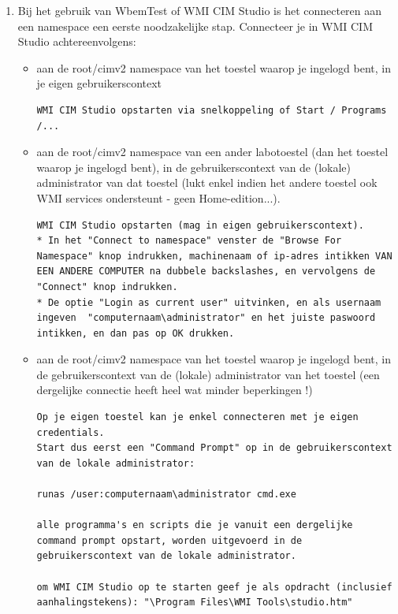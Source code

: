 \documentclass[11pt,a4paper]{report}
\begin{document}
\begin{enumerate} 
	\item Bij het gebruik van WbemTest of WMI CIM Studio is het connecteren aan een namespace een eerste noodzakelijke stap. Connecteer je in WMI CIM Studio achtereenvolgens:
	\begin{itemize}
		\item aan de root/cimv2 namespace van het toestel waarop je ingelogd bent, in je eigen gebruikerscontext
		\begin{lstlisting}
WMI CIM Studio opstarten via snelkoppeling of Start / Programs /...
		\end{lstlisting}
		\item aan de root/cimv2 namespace van een ander labotoestel (dan het toestel waarop je ingelogd bent), in de gebruikerscontext van de (lokale) administrator van dat toestel
		(lukt enkel indien het andere toestel ook WMI services ondersteunt - geen Home-edition...).
		\begin{lstlisting}
WMI CIM Studio opstarten (mag in eigen gebruikerscontext). 
* In het "Connect to namespace" venster de "Browse For Namespace" knop indrukken, machinenaam of ip-adres intikken VAN EEN ANDERE COMPUTER na dubbele backslashes, en vervolgens de "Connect" knop indrukken. 
* De optie "Login as current user" uitvinken, en als usernaam ingeven  "computernaam\administrator" en het juiste paswoord intikken, en dan pas op OK drukken.
		\end{lstlisting}
		\item aan de root/cimv2 namespace van het toestel waarop je ingelogd bent, in de gebruikerscontext van de (lokale) administrator van het toestel (een dergelijke connectie heeft heel wat minder beperkingen !)
		\begin{lstlisting}
Op je eigen toestel kan je enkel connecteren met je eigen credentials. 
Start dus eerst een "Command Prompt" op in de gebruikerscontext van de lokale administrator: 

runas /user:computernaam\administrator cmd.exe

alle programma's en scripts die je vanuit een dergelijke command prompt opstart, worden uitgevoerd in de gebruikerscontext van de lokale administrator.

om WMI CIM Studio op te starten geef je als opdracht (inclusief aanhalingstekens): "\Program Files\WMI Tools\studio.htm"
		\end{lstlisting}
	\end{itemize}
\end{enumerate}
\end{document}

